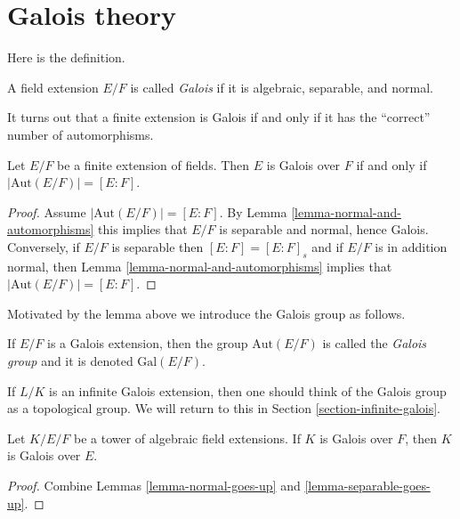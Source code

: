 \section{Galois theory}
\label{section-galois-theory}

\noindent
Here is the definition.

\begin{definition}
\label{definition-galois}
A field extension $E/F$ is called {\it Galois} if it is algebraic,
separable, and normal.
\end{definition}

\noindent
It turns out that a finite extension is Galois if and only if it has
the ``correct'' number of automorphisms.

\begin{lemma}
\label{lemma-finite-Galois}
Let $E/F$ be a finite extension of fields. Then $E$ is Galois over $F$
if and only if $|\text{Aut}(E/F)| = [E : F]$.
\end{lemma}

\begin{proof}
Assume $|\text{Aut}(E/F)| = [E : F]$. By
Lemma \ref{lemma-normal-and-automorphisms} this implies
that $E/F$ is separable and normal, hence Galois.
Conversely, if $E/F$ is separable then $[E : F] = [E : F]_s$ and
if $E/F$ is in addition normal, then
Lemma \ref{lemma-normal-and-automorphisms} implies that
$|\text{Aut}(E/F)| = [E : F]$.
\end{proof}

\noindent
Motivated by the lemma above we introduce the Galois group as follows.

\begin{definition}
\label{definition-galois-group}
If $E/F$ is a Galois extension, then the group $\text{Aut}(E/F)$ is
called the {\it Galois group} and it is denoted $\text{Gal}(E/F)$.
\end{definition}

\noindent
If $L/K$ is an infinite Galois extension, then one should think of the
Galois group as a topological group. We will return to this in
Section \ref{section-infinite-galois}.

\begin{lemma}
\label{lemma-galois-goes-up}
Let $K/E/F$ be a tower of algebraic field extensions.
If $K$ is Galois over $F$, then $K$ is Galois over $E$.
\end{lemma}

\begin{proof}
Combine Lemmas \ref{lemma-normal-goes-up} and \ref{lemma-separable-goes-up}.
\end{proof}

